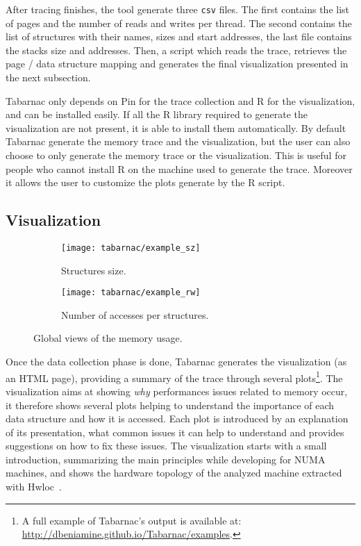 After tracing finishes, the tool generate three \texttt{csv} files.
The first contains the list of pages and the number of reads and writes per thread.
The second contains the list of structures with their names, sizes and start addresses, the last file contains the stacks size and addresses.
Then, a script which reads the trace, retrieves the page / data structure mapping and generates the final visualization presented in the next subsection.

\gls{Tabarnac} only depends on \gls{Pin} for the trace collection and \gls{R} for the visualization, and can be installed easily.
If all the R library required to generate the visualization are not present, it is able to install them automatically.
By default \gls{Tabarnac} generate the memory trace and the visualization, but the user can also choose to only generate the memory trace or the visualization.
This is useful for people who cannot install \gls{R} on the machine used to generate the trace.
Moreover it allows the user to customize the plots generate by the \gls{R} script.

\subsection{Visualization}

\begin{figure}[htb]
    \centering
    \begin{subfigure}{.49\linewidth}
        \texttt{[image: tabarnac/example\_sz]}
        \caption{Structures size.}
        \label{fig:example_sz}
    \end{subfigure}
    \begin{subfigure}{.49\linewidth}
        \texttt{[image: tabarnac/example\_rw]}
        \caption{Number of accesses per structures.}
        \label{fig:example_rw}
    \end{subfigure}
    \caption{Global views of the memory usage.}
    \label{fig:example_plot1}
\end{figure}

Once the data collection phase is done,
\gls{Tabarnac} generates the visualization (as an HTML page), providing a summary
of the trace through several plots\footnote{A full example of \gls{Tabarnac}'s output is available at:\\\small
    \url{http://dbeniamine.github.io/Tabarnac/examples}.}.
The visualization aims at showing \emph{why} performances issues related
to memory occur, it therefore shows several plots helping to understand the
importance of each data structure and how it is accessed.
Each plot is introduced by an explanation
of its presentation, what common issues it can help to understand and provides
suggestions on how to fix these issues.  The visualization starts with a small
introduction, summarizing the main principles while developing for NUMA
machines, and shows the hardware topology of the analyzed machine extracted
with Hwloc~\cite{Broquedis10hwloc}.


